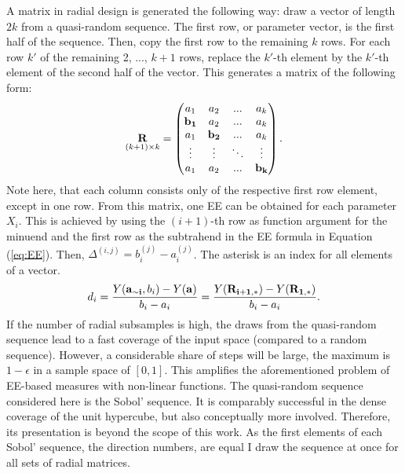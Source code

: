 \noindent
A matrix in radial design is generated the following way: draw a vector of length $2k$ from a quasi-random sequence. The first row, or parameter vector, is the first half of the sequence. Then, copy the first row to the remaining $k$ rows. For each row $k'$ of the remaining 2, ..., $k+1$ rows, replace the $k'$-th element by the $k'$-th element of the second half of the vector. This generates a matrix of the following form:
\begin{align}
\underset{(k+1)\times k}{\bold{R}} =
\begin{pmatrix}
a_1 & a_2 & ... & a_k \\
\bold{b_1} & a_2 & ... & a_k \\
a_1 & \bold{b_2} & ... & a_k \\
\vdots & \vdots & 	\ddots & \vdots\\
a_1 & a_2 & ... & \bold{b_k}
\end{pmatrix}.
\end{align}
\noindent
Note here, that each column consists only of the respective first row element, except in one row.
From this matrix, one EE can be obtained for each parameter $X_i$. This is achieved by using the $(i+1)$-th row as function argument for the minuend and the first row as the subtrahend in the EE formula in Equation (\ref{eq:EE}). Then, $\Delta^{(i,j)} = b_i^{(j)} - a_i^{(j)}$. The asterisk is an index for all elements of a vector.
\begin{align} \label{eq:rad}
d_i =  \frac{Y(\bold{a_{\sim i}}, b_i) - Y(\bold{a})}{b_i - a_i} = \frac{Y(\bold{R_{i+1,*}}) -  Y(\bold{R_{1,*}})}{b_i - a_i}.
\end{align}
If the number of radial subsamples is high, the draws from the quasi-random sequence lead to a fast coverage of the input space (compared to a random sequence). However, a considerable share of steps will be large, the maximum is $1-\epsilon$ in a sample space of $[0,1]$. This amplifies the aforementioned problem of EE-based measures with non-linear functions. The quasi-random sequence considered here is the Sobol' sequence. It is comparably successful in the dense coverage of the unit hypercube, but also conceptually more involved. Therefore, its presentation is beyond the scope of this work. As the first elements of each Sobol' sequence, the direction numbers, are equal I draw the sequence at once for all sets of radial matrices.\\


